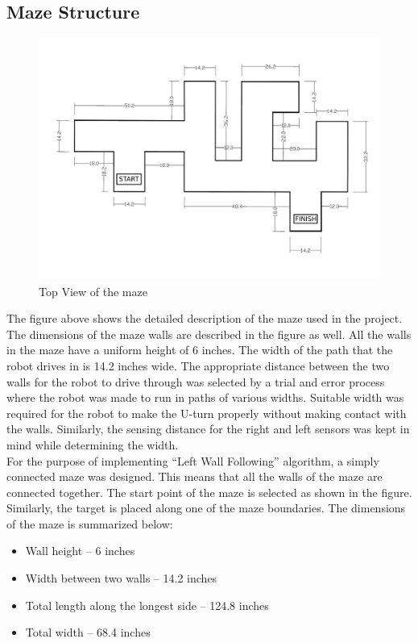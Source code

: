 \subsection{Maze Structure}
\begin{figure}[h]
\center
\includegraphics[scale=0.25]{top_view_lowres.png}    
\caption{Top View of the maze}
\end{figure}
\justify The figure above shows the detailed description of the maze used in the project. The dimensions of the maze walls are described in the figure as well. All the walls in the maze have a uniform height of 6 inches. The width of the path that the robot drives in is 14.2 inches wide. The appropriate distance between the two walls for the robot to drive through was selected by a trial and error process where the robot was made to run in paths of various widths. Suitable width was required for the robot to make the U-turn properly without making contact with the walls. Similarly, the sensing distance for the right and left sensors was kept in mind while determining the width.\\
For the purpose of implementing “Left Wall Following” algorithm, a simply connected maze was designed. This means that all the walls of the maze are connected together. 
The start point of the maze is selected as shown in the figure. Similarly, the target is placed along one of the maze boundaries. The dimensions of the maze is summarized below:
\begin{itemize}
\item Wall height – 6 inches
\item Width between two walls – 14.2 inches
\item Total length along the longest side – 124.8 inches 
\item Total width – 68.4 inches
\end{itemize}
